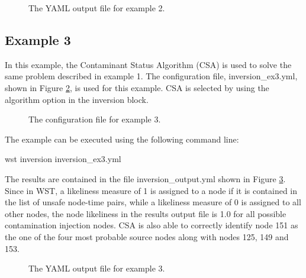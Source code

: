 \begin{figure}[!ht]
  \caption{The  YAML output file for example 2.}
  \label{fig:inversion_ex2_re}
\end{figure}

\subsection{Example 3}  
In this example, the Contaminant Status Algorithm (CSA) is used to solve
the same problem described in example 1. The configuration file,
inversion\_ex3.yml, shown in Figure \ref{fig:inversion_ex3}, is used for
this example. CSA is selected
by using the algorithm option in the inversion
block.
 
\begin{figure}[!ht]
  \caption{The  configuration file for example 3.}
  \label{fig:inversion_ex3}
\end{figure}


The example can be executed using the following command line:
\begin{unknownListing}
wst inversion inversion_ex3.yml
\end{unknownListing}

The results are contained in the file
{\outputprefix}inversion\_output.yml shown in
Figure \ref{fig:inversion_ex3_re}. Since in WST, a
likeliness measure of 1 is assigned to a node if it is contained in the list of
unsafe node-time pairs, while a likeliness measure of 0 is assigned to all other nodes, 
the node likeliness in the results output file is 1.0 for all possible contamination injection nodes. 
CSA is also able to correctly identify node 151 as the one of the four most probable
source nodes along with nodes 125, 149 and 153.

\begin{figure}[!ht]
  \caption{The  YAML output file for example 3.}
  \label{fig:inversion_ex3_re}
\end{figure}


